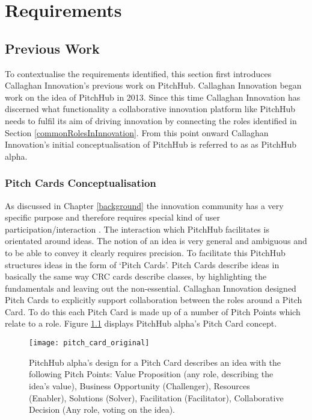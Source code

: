 \chapter{Requirements}\label{C:requirements}

\section{Previous Work}

To contextualise the requirements identified, this section first introduces Callaghan Innovation's previous work on PitchHub. Callaghan Innovation began work on the idea of PitchHub in 2013. Since this time Callaghan Innovation has discerned what functionality a collaborative innovation platform like PitchHub needs to fulfil its aim of driving innovation by connecting the roles identified in Section \ref{commonRolesInInnovation}. From this point onward Callaghan Innovation's initial conceptualisation of PitchHub is referred to as as PitchHub alpha.

\subsection{Pitch Cards Conceptualisation}
As discussed in Chapter \ref{background} the innovation community has a very specific purpose and therefore requires special kind of user participation/interaction \cite{Jruby:online}. The interaction which PitchHub facilitates is orientated around ideas. The notion of an idea is very general and ambiguous and to be able to convey it clearly requires precision. To facilitate this PitchHub structures ideas in the form of `Pitch Cards'. Pitch Cards describe ideas in basically the same way CRC cards describe classes, by highlighting the fundamentals and leaving out the non-essential. Callaghan Innovation designed Pitch Cards to explicitly support collaboration between the roles around a Pitch Card. To do this each Pitch Card is made up of a number of Pitch Points which relate to a role. Figure \ref{fig:pitch_card_original} displays PitchHub alpha's Pitch Card concept.
\begin{figure}[ht]
    \centering
    \texttt{[image: pitch\_card\_original]}
    \caption{PitchHub alpha's design for a Pitch Card describes an idea with the following Pitch Points: Value Proposition (any role, describing the idea's value), Business Opportunity (Challenger), Resources (Enabler), Solutions (Solver), Facilitation (Facilitator), Collaborative Decision (Any role, voting on the idea).}
    \label{fig:pitch_card_original}
\end{figure}

